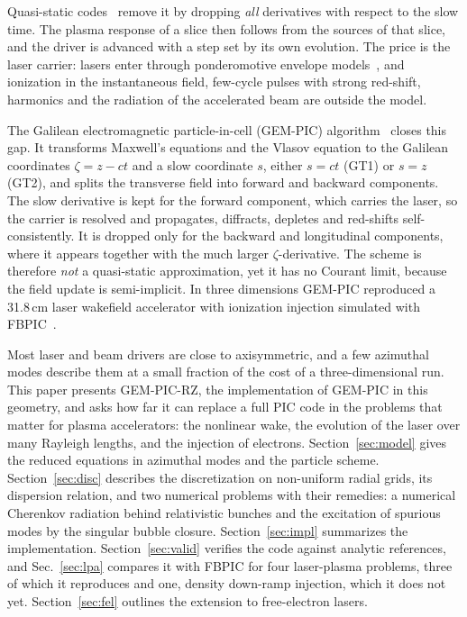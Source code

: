 \documentclass[aps,prab,reprint,floatfix,superscriptaddress,amsmath,amssymb]{revtex4-2}
\begin{document}
Quasi-static codes~\cite{Sprangle1990,Mora1997,Lotov2003,Huang2006,Mehrling2014,Li2021,Diederichs2022,FerranPousa2019} remove it by dropping \emph{all} derivatives with respect to the slow time. The plasma response of a slice then follows from the sources of that slice, and the driver is advanced with a step set by its own evolution. The price is the laser carrier: lasers enter through ponderomotive envelope models~\cite{Mora1997,Benedetti2018}, and ionization in the instantaneous field, few-cycle pulses with strong red-shift, harmonics and the radiation of the accelerated beam are outside the model.

The Galilean electromagnetic particle-in-cell (GEM-PIC) algorithm~\cite{GEMPIC} closes this gap. It transforms Maxwell's equations and the Vlasov equation to the Galilean coordinates $\zeta = z - ct$ and a slow coordinate $s$, either $s = ct$ (GT1) or $s = z$ (GT2), and splits the transverse field into forward and backward components. The slow derivative is kept for the forward component, which carries the laser, so the carrier is resolved and propagates, diffracts, depletes and red-shifts self-consistently. It is dropped only for the backward and longitudinal components, where it appears together with the much larger $\zeta$-derivative. The scheme is therefore \emph{not} a quasi-static approximation, yet it has no Courant limit, because the field update is semi-implicit. In three dimensions GEM-PIC reproduced a 31.8\,cm laser wakefield accelerator with ionization injection simulated with FBPIC~\cite{GEMPIC}.

Most laser and beam drivers are close to axisymmetric, and a few azimuthal modes describe them at a small fraction of the cost of a three-dimensional run. This paper presents GEM-PIC-RZ, the implementation of GEM-PIC in this geometry, and asks how far it can replace a full PIC code in the problems that matter for plasma accelerators: the nonlinear wake, the evolution of the laser over many Rayleigh lengths, and the injection of electrons. Section~\ref{sec:model} gives the reduced equations in azimuthal modes and the particle scheme. Section~\ref{sec:disc} describes the discretization on non-uniform radial grids, its dispersion relation, and two numerical problems with their remedies: a numerical Cherenkov radiation behind relativistic bunches and the excitation of spurious modes by the singular bubble closure. Section~\ref{sec:impl} summarizes the implementation. Section~\ref{sec:valid} verifies the code against analytic references, and Sec.~\ref{sec:lpa} compares it with FBPIC for four laser-plasma problems, three of which it reproduces and one, density down-ramp injection, which it does not yet. Section~\ref{sec:fel} outlines the extension to free-electron lasers.
\end{document}
